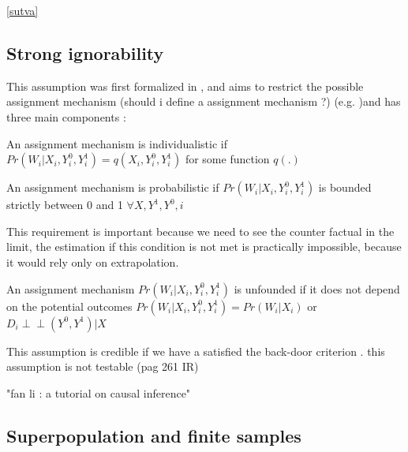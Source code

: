 \ref{sutva}

\subsection{Strong ignorability}
This assumption was first formalized in \citep{rosenbaum1983central} , and aims to restrict the possible assignment mechanism  (should i define a assignment mechanism ?) (e.g. )and has three main components :

\begin{ass}
An assignment mechanism is individualistic if $Pr(W_i| X_i , Y_i^0 ,Y_i^1) = q( X_i , Y_i^0 ,Y_i^1)$ for some function $q(.)$
\end{ass}

\begin{ass}
An assignment mechanism is probabilistic if $Pr(W_i| X_i , Y_i^0 ,Y_i^1)$ is bounded strictly between 0 and 1 $\forall X,Y^1,Y^0,i$
\end{ass}
This requirement is important because we need to see the counter factual in the limit, the estimation if this condition is not met is practically impossible, because it would rely only on extrapolation.  


\begin{ass}
An assignment mechanism $Pr(W_i| X_i , Y_i^0 ,Y_i^1)$ is unfounded if  it does not depend on the potential outcomes $Pr(W_i| X_i , Y_i^0 ,Y_i^1)=Pr(W_i| X_i )$ or $D_i  \perp\!\!\!\perp (Y^{0},Y^{1}) | X$
\end{ass}
This assumption is credible if we have a satisfied  the back-door criterion \citep{cunningham2021causal}.
this assumption is not testable (pag 261 IR)





"fan li : a tutorial on causal inference"

\subsection{Superpopulation and finite samples}



